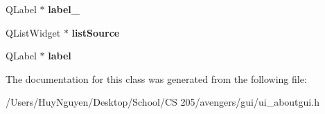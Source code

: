 \begin{DoxyCompactItemize}
\item 
Q\+Label $\ast$ {\bfseries label\+\_}\hypertarget{classUi__AboutGUI_a48c1ed37f1c75971935cc499caf2b59f}{}\label{classUi__AboutGUI_a48c1ed37f1c75971935cc499caf2b59f}

\item 
Q\+List\+Widget $\ast$ {\bfseries list\+Source}\hypertarget{classUi__AboutGUI_a20fe8c612569cec7b19eb2942b908442}{}\label{classUi__AboutGUI_a20fe8c612569cec7b19eb2942b908442}

\item 
Q\+Label $\ast$ {\bfseries label}\hypertarget{classUi__AboutGUI_a6a5d4e881c0faf8959856d0e596469cb}{}\label{classUi__AboutGUI_a6a5d4e881c0faf8959856d0e596469cb}

\end{DoxyCompactItemize}


The documentation for this class was generated from the following file\+:\begin{DoxyCompactItemize}
\item 
/\+Users/\+Huy\+Nguyen/\+Desktop/\+School/\+C\+S 205/avengers/gui/ui\+\_\+aboutgui.\+h\end{DoxyCompactItemize}
